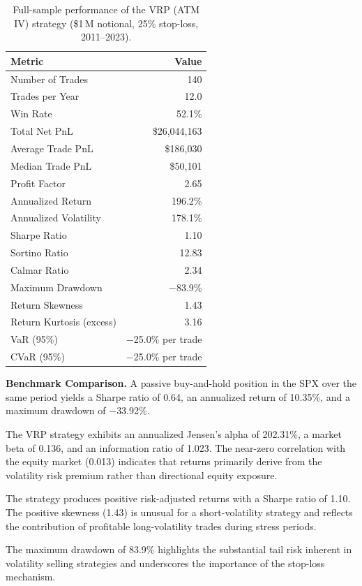 \documentclass[11pt,a4paper]{article}
\begin{document}
\begin{table}[H]
\centering
\caption{Full-sample performance of the VRP (ATM IV) strategy (\$1\,M notional, 25\% stop-loss, 2011--2023).}
\label{tab:fullsample}

\begin{minipage}{0.48\textwidth}
\centering
\begin{tabular}{@{}lr@{}}
\toprule
\textbf{Metric} & \textbf{Value} \\
\midrule
Number of Trades & 140 \\
Trades per Year & 12.0 \\
Win Rate & 52.1\% \\
Total Net PnL & \$26{,}044{,}163 \\
Average Trade PnL & \$186{,}030 \\
Median Trade PnL & \$50{,}101 \\
Profit Factor & 2.65 \\
Annualized Return & 196.2\% \\
Annualized Volatility & 178.1\% \\
Sharpe Ratio & 1.10 \\
Sortino Ratio & 12.83 \\
Calmar Ratio & 2.34 \\
Maximum Drawdown & $-$83.9\% \\
Return Skewness & 1.43 \\
Return Kurtosis (excess) & 3.16 \\
VaR (95\%) & $-$25.0\% per trade \\
CVaR (95\%) & $-$25.0\% per trade \\
\bottomrule
\end{tabular}
\end{minipage}
\hfill
\begin{minipage}{0.48\textwidth}
\small

\textbf{Benchmark Comparison.}  
A passive buy-and-hold position in the SPX over the same period yields a Sharpe ratio of 0.64, an annualized return of 10.35\%, and a maximum drawdown of $-$33.92\%.

The VRP strategy exhibits an annualized Jensen's alpha of 202.31\%, a market beta of 0.136, and an information ratio of 1.023. The near-zero correlation with the equity market (0.013) indicates that returns primarily derive from the volatility risk premium rather than directional equity exposure.

The strategy produces positive risk-adjusted returns with a Sharpe ratio of 1.10. The positive skewness (1.43) is unusual for a short-volatility strategy and reflects the contribution of profitable long-volatility trades during stress periods.

The maximum drawdown of 83.9\% highlights the substantial tail risk inherent in volatility selling strategies and underscores the importance of the stop-loss mechanism.

\end{minipage}

\end{table}
\end{document}
